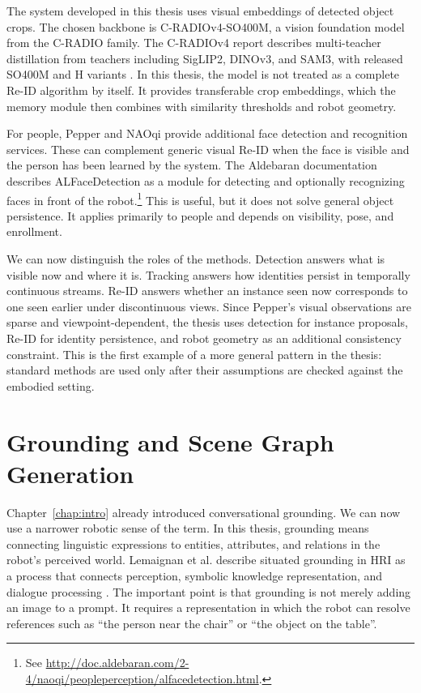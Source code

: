 The system developed in this thesis uses visual embeddings of detected object crops. The chosen backbone is C-RADIOv4-SO400M, a vision foundation model from the C-RADIO family. The C-RADIOv4 report describes multi-teacher distillation from teachers including SigLIP2, DINOv3, and SAM3, with released SO400M and H variants \cite{ranzinger2026cradiov4techreport}. In this thesis, the model is not treated as a complete Re-ID algorithm by itself. It provides transferable crop embeddings, which the memory module then combines with similarity thresholds and robot geometry.

For people, Pepper and NAOqi provide additional face detection and recognition services. These can complement generic visual Re-ID when the face is visible and the person has been learned by the system. The Aldebaran documentation describes ALFaceDetection as a module for detecting and optionally recognizing faces in front of the robot.\footnote{See \url{http://doc.aldebaran.com/2-4/naoqi/peopleperception/alfacedetection.html}.} This is useful, but it does not solve general object persistence. It applies primarily to people and depends on visibility, pose, and enrollment.

We can now distinguish the roles of the methods. Detection answers what is visible now and where it is. Tracking answers how identities persist in temporally continuous streams. Re-ID answers whether an instance seen now corresponds to one seen earlier under discontinuous views. Since Pepper's visual observations are sparse and viewpoint-dependent, the thesis uses detection for instance proposals, Re-ID for identity persistence, and robot geometry as an additional consistency constraint. This is the first example of a more general pattern in the thesis: standard methods are used only after their assumptions are checked against the embodied setting.

\section{Grounding and Scene Graph Generation}\label{sec:grounding-sgg}

Chapter~\ref{chap:intro} already introduced conversational grounding. We can now use a narrower robotic sense of the term. In this thesis, grounding means connecting linguistic expressions to entities, attributes, and relations in the robot's perceived world. Lemaignan et al. describe situated grounding in HRI as a process that connects perception, symbolic knowledge representation, and dialogue processing \cite[181--182]{lemaignan_grounding_2012}. The important point is that grounding is not merely adding an image to a prompt. It requires a representation in which the robot can resolve references such as \enquote{the person near the chair} or \enquote{the object on the table}.

